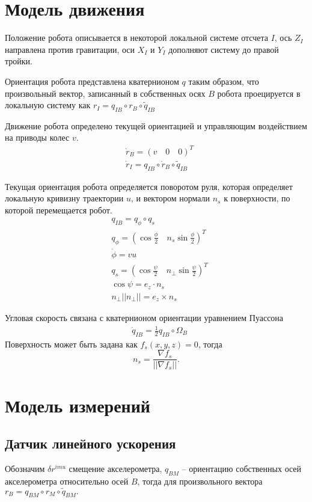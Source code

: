 \documentclass[a4paper,12pt]{article}
\begin{document}
\section{Модель движения}

Положение робота описывается в некоторой локальной системе отсчета $I$, ось $Z_I$ направлена против гравитации, оси $X_I$ и $Y_I$ дополняют систему до правой тройки.

Ориентация робота представлена кватернионом $q$ таким образом, что произвольный вектор, записанный в собственных осях $B$ робота проецируется в локальную систему как
$r_I = q_{IB} \circ r_B \circ \tilde{q}_{IB}$

Движение робота определено текущей ориентацией и управляющим воздействием на приводы колес $v$.
\begin{align} \label{eq:model_velocity}
&\dot{r}_B = (v \quad 0 \quad 0)^T \\
&\dot{r}_I = q_{IB} \circ \dot{r}_B \circ \tilde{q}_{IB}
\end{align}

Текущая ориентация робота определяется поворотом руля, которая определяет локальную кривизну траектории $u$, и вектором нормали $n_s$ к поверхности, по которой перемещается робот.
\begin{align} 
&q_{IB} = q_{\phi} \circ q_{s} \\
&q_{\phi} = (\cos{\frac{\phi}{2}} \quad n_{s}\sin{\frac{\phi}{2}})^T \\
&\dot{\phi} = vu \\
&q_{s} = (\cos{\frac{\psi}{2}} \quad n_{\perp}\sin{\frac{\psi}{2}})^T \\
&\cos{\psi} = e_z \cdot n_s \\
& n_{\perp} ||n_{\perp}|| = e_z \times n_s 
\end{align}

Угловая скорость связана с кватернионом ориентации уравнением Пуассона
\begin{align}  \label{eq:model_rot_velocity}
&\dot{q}_{IB} = \frac{1}{2} q_{IB} \circ \Omega_{B}
\end{align}
Поверхность может быть задана как $f_s(x,y,z) = 0$,
тогда 
$$n_s = \frac{\nabla f_s}{||\nabla f_s||}.$$


\section{Модель измерений}
	
\subsection{Датчик линейного ускорения}
Обозначим $\delta r^{imu}$ смещение акселерометра,  $q_{BM}$ -- ориентацию собственных осей акселерометра относительно осей $B$, тогда для произвольного вектора
$r_B = q_{BM} \circ r_M \circ \tilde{q}_{BM}.$
\end{document}
